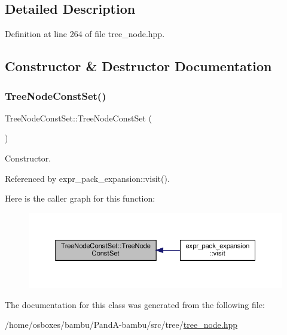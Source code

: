 \subsection{Detailed Description}


Definition at line 264 of file tree\+\_\+node.\+hpp.



\subsection{Constructor \& Destructor Documentation}
\mbox{\label{classTreeNodeConstSet_a5307bbf4343e1acac110e44a9b107518}} 
\subsubsection{\texorpdfstring{Tree\+Node\+Const\+Set()}{TreeNodeConstSet()}}
{\footnotesize\ttfamily Tree\+Node\+Const\+Set\+::\+Tree\+Node\+Const\+Set (\begin{DoxyParamCaption}{ }\end{DoxyParamCaption})}



Constructor. 



Referenced by expr\+\_\+pack\+\_\+expansion\+::visit().

Here is the caller graph for this function\+:
\nopagebreak
\begin{figure}[H]
\begin{center}
\leavevmode
\includegraphics[width=350pt]{d4/d9c/classTreeNodeConstSet_a5307bbf4343e1acac110e44a9b107518_icgraph}
\end{center}
\end{figure}


The documentation for this class was generated from the following file\+:\begin{DoxyCompactItemize}
\item 
/home/osboxes/bambu/\+Pand\+A-\/bambu/src/tree/\hyperlink{tree__node_8hpp}{tree\+\_\+node.\+hpp}\end{DoxyCompactItemize}
